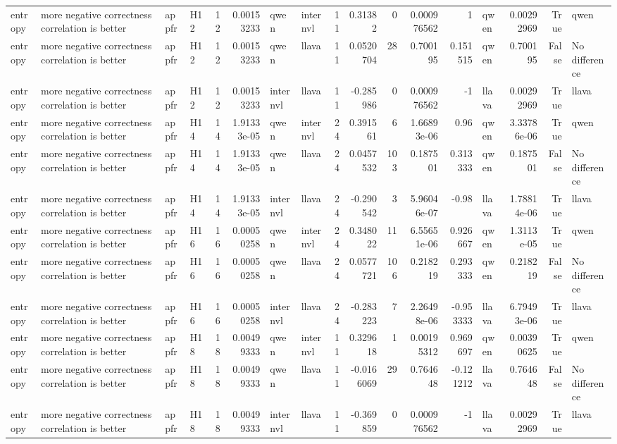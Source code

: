 \begin{longtable}{llllrrllrrrrrlrrl}
entropy & more negative correctness correlation is better & appfr & H12 & 12 & 0.00153233 & qwen & internvl & 11 & 0.31382 & 0 & 0.000976562 & 1 & qwen & 0.00292969 & True & qwen \\
entropy & more negative correctness correlation is better & appfr & H12 & 12 & 0.00153233 & qwen & llava & 11 & 0.0520704 & 28 & 0.700195 & 0.151515 & qwen & 0.700195 & False & No difference \\
entropy & more negative correctness correlation is better & appfr & H12 & 12 & 0.00153233 & internvl & llava & 11 & -0.285986 & 0 & 0.000976562 & -1 & llava & 0.00292969 & True & llava \\
entropy & more negative correctness correlation is better & appfr & H14 & 14 & 1.91333e-05 & qwen & internvl & 24 & 0.391561 & 6 & 1.66893e-06 & 0.96 & qwen & 3.33786e-06 & True & qwen \\
entropy & more negative correctness correlation is better & appfr & H14 & 14 & 1.91333e-05 & qwen & llava & 24 & 0.0457532 & 103 & 0.187501 & 0.313333 & qwen & 0.187501 & False & No difference \\
entropy & more negative correctness correlation is better & appfr & H14 & 14 & 1.91333e-05 & internvl & llava & 24 & -0.290542 & 3 & 5.96046e-07 & -0.98 & llava & 1.78814e-06 & True & llava \\
entropy & more negative correctness correlation is better & appfr & H16 & 16 & 0.00050258 & qwen & internvl & 24 & 0.348022 & 11 & 6.55651e-06 & 0.926667 & qwen & 1.3113e-05 & True & qwen \\
entropy & more negative correctness correlation is better & appfr & H16 & 16 & 0.00050258 & qwen & llava & 24 & 0.0577721 & 106 & 0.218219 & 0.293333 & qwen & 0.218219 & False & No difference \\
entropy & more negative correctness correlation is better & appfr & H16 & 16 & 0.00050258 & internvl & llava & 24 & -0.283223 & 7 & 2.26498e-06 & -0.953333 & llava & 6.79493e-06 & True & llava \\
entropy & more negative correctness correlation is better & appfr & H18 & 18 & 0.00499333 & qwen & internvl & 11 & 0.329618 & 1 & 0.00195312 & 0.969697 & qwen & 0.00390625 & True & qwen \\
entropy & more negative correctness correlation is better & appfr & H18 & 18 & 0.00499333 & qwen & llava & 11 & -0.0166069 & 29 & 0.764648 & -0.121212 & llava & 0.764648 & False & No difference \\
entropy & more negative correctness correlation is better & appfr & H18 & 18 & 0.00499333 & internvl & llava & 11 & -0.369859 & 0 & 0.000976562 & -1 & llava & 0.00292969 & True & llava \\

\end{longtable}
